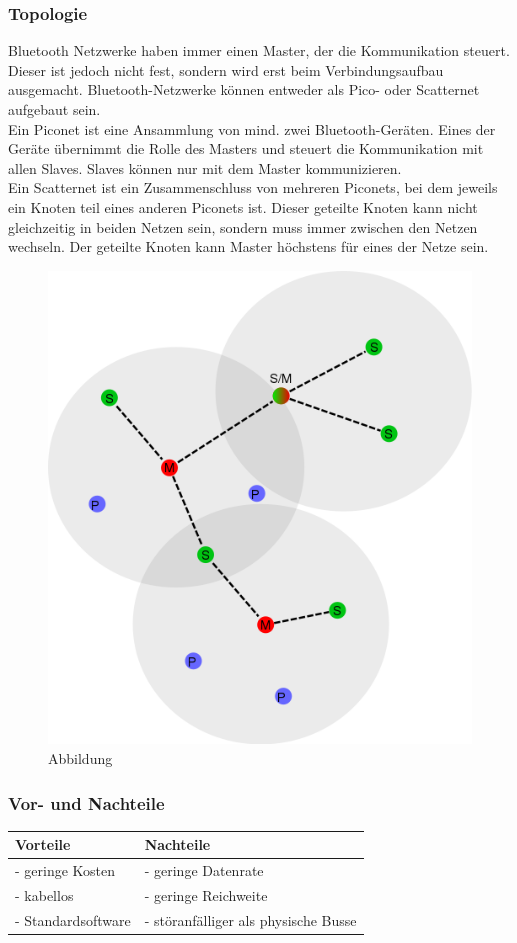 \subsubsection{Topologie}
Bluetooth Netzwerke haben immer einen Master, der die Kommunikation steuert. Dieser ist jedoch nicht fest, sondern wird erst beim Verbindungsaufbau ausgemacht.
Bluetooth-Netzwerke können entweder als Pico- oder Scatternet aufgebaut sein.
\\                                                                                  
Ein Piconet ist eine Ansammlung von mind. zwei Bluetooth-Geräten. Eines der Geräte übernimmt die Rolle des Masters und steuert die Kommunikation mit allen Slaves. Slaves können nur mit dem Master kommunizieren.
\\                                                                                  Ein Scatternet ist ein Zusammenschluss von mehreren Piconets, bei dem jeweils ein Knoten teil eines anderen Piconets ist. Dieser geteilte Knoten kann nicht gleichzeitig in beiden Netzen sein, sondern muss immer zwischen den Netzen wechseln. Der geteilte Knoten kann Master höchstens für eines der Netze sein.
\\
\begin{figure}[h!]
	\includegraphics[width=0.7\linewidth]{pico_scatternet.png}
	\caption{Abbildung  \cite{.MH_Scatter}}
\end{figure}

\subsubsection{Vor- und Nachteile}
\begin{tabular}{l|l}
	Vorteile & Nachteile\\
	\hline - geringe Kosten & - geringe Datenrate\\
	\hline - kabellos & - geringe Reichweite\\
	\hline - Standardsoftware & - störanfälliger als physische Busse\\
\end{tabular}